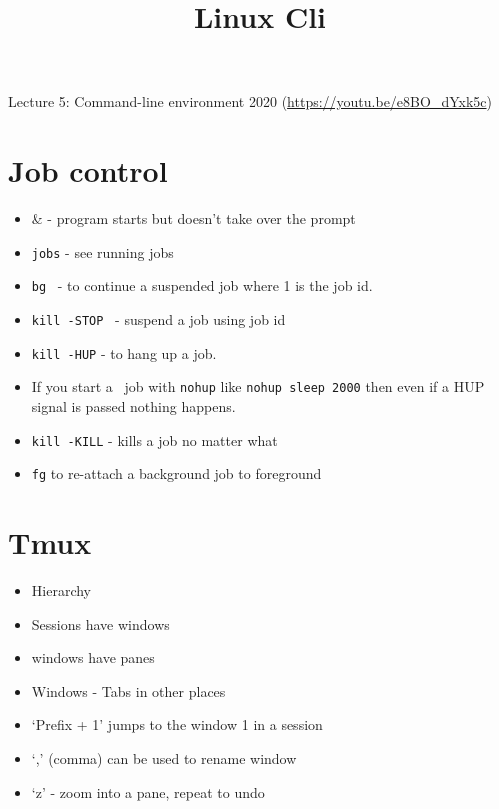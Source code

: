 \documentclass{../template/texnote}
\title{Linux Cli}
\begin{document}
    \maketitle {}
Lecture 5: Command-line environment 2020 (\url{https://youtu.be/e8BO_dYxk5c})
\section{Job control}
	\begin{itemize}
		\item \& - program starts but doesn’t take over the prompt
		\item \texttt{jobs} - see running jobs
		\item \texttt{bg}   - to continue a suspended job where 1 is the job id.  
		\item \texttt{kill -STOP}  - suspend a job using job id

		\item \texttt{kill -HUP} - to hang up a job. 
		\item If you start a  job with \texttt{nohup} like \texttt{nohup sleep 2000} then even if a HUP signal is passed nothing happens.
		\item \texttt{kill -KILL} - kills a job no matter what
		\item \texttt{fg} to re-attach a background job to foreground

	\end{itemize}


\section{Tmux}
	\begin{itemize}
		\item Hierarchy
		\item Sessions have windows
		\item windows have panes
		\item Windows - Tabs in other places
		\item  `Prefix + 1' jumps to the window 1 in a session
		\item  `,' (comma) can be used to rename window
		\item `z' - zoom into a pane, repeat to undo
	\end{itemize}
    \printbibliography
\end{document}
